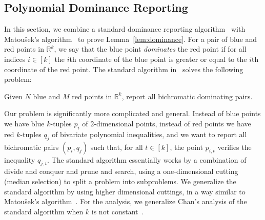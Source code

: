 \subsection{Polynomial Dominance Reporting}%
\label{sec:algo:dominance}


In this section, we combine a standard dominance reporting
algorithm~\cite{PS85} with Matou\v{s}ek's algorithm~\cite{Ma93} to prove
Lemma~\ref{lem:dominance}.
For a pair of blue and red points in $\mathbb{R}^k$, we say that the blue point
\emph{dominates} the red point if for all indices $i\in[k]$ the $i$th
coordinate of the blue point is greater or equal to the $i$th coordinate of the
red point.
The standard algorithm in~\cite{PS85} solves the following problem:
\begin{problem}
	Given $N$ blue
	and $M$ red points in $\mathbb{R}^k$, report all
	bichromatic dominating pairs.
\end{problem}
Our problem is significantly more complicated and general. Instead of blue points we
have blue $k$-tuples $p_i$ of $2$-dimensional points, instead of red points we have
red $k$-tuples $q_j$ of bivariate polynomial inequalities, and we want to report
all bichromatic pairs $(p_i,q_j)$ such that, for all $t \in [k]$,
the point $p_{i,t}$ verifies the inequality $q_{j,t}$.
The standard algorithm essentially works by a combination of divide and conquer
and prune and search, using a one-dimensional cutting (median selection) to
split a problem into subproblems. We generalize the standard algorithm by using
higher dimensional cuttings, in a way similar to Matou\v{s}ek's
algorithm~\cite{Ma93}. For the analysis, we generalize Chan's analysis
of the standard algorithm when $k$ is not constant~\cite{Cha08}.

